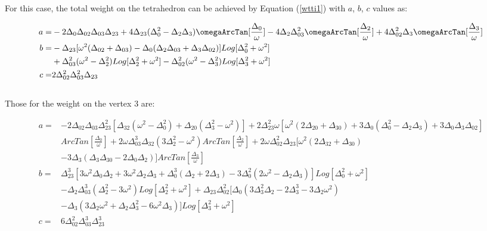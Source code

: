 \documentclass[10pt]{article}
\begin{document}
For this case, the total weight on the tetrahedron can be achieved by Equation (\ref{wtti1}) with $a$, $b$, $c$ values as:

\begin{subequations}\label{wtti2a}
\begin{align}
a=&-2\Delta_{0}\Delta_{02}\Delta_{03}\Delta_{23}+4\Delta_{23}(\Delta_0^2-\Delta_2\Delta_3)\omegaArcTan[\frac{\Delta_0}{\omega}]-4\Delta_{2}\Delta_{03}^2\omegaArcTan[\frac{\Delta_2}{\omega}]+4\Delta_{02}^2\Delta_{3}\omegaArcTan[\frac{\Delta_3}{\omega}]\\
b=&-\Delta_{23}[\omega^2(\Delta_{02}+\Delta_{03})-\Delta_0(\Delta_2\Delta_{03}+\Delta_3\Delta_{02})]Log[\Delta_0^2+\omega^2]\nonumber\\&+\Delta_{03}^2(\omega^2-\Delta_{2}^2)Log[\Delta_2^2+\omega^2]-\Delta_{02}^2(\omega^2-\Delta_{3}^2)Log[\Delta_3^2+\omega^2]\\
c=&2\Delta_{02}^2\Delta_{03}^2\Delta_{23}
\end{align}
\end{subequations}\\

Those for the weight on the vertex 3 are:

\begin{subequations}\label{wtti2az}
\begin{align}
a=&-2\Delta_{02}\Delta_{03}\Delta_{23}^2[\Delta_{32}(\omega^2-\Delta_0^2)+\Delta_{20}(\Delta_{3}^2-\omega^2)]+2\Delta_{23}^2\omega[\omega^2(2\Delta_{20}+\Delta_{30})+3\Delta_0(\Delta_0^2-\Delta_2\Delta_3)+3\Delta_0\Delta_3\Delta_{02}]\nonumber\\&ArcTan[\frac{\Delta_0}{\omega}]+2\omega\Delta_{03}^3\Delta_{32}(3\Delta_2^2-\omega^2)ArcTan[\frac{\Delta_2}{\omega}]+2\omega\Delta_{02}^2\Delta_{23}[\omega^2(2\Delta_{32}+\Delta_{30})\nonumber\\&-3\Delta_3(\Delta_3\Delta_{30}-2\Delta_0\Delta_2)]ArcTan[\frac{\Delta_3}{\omega}]\\
b=&\Delta_{23}^3[3\omega^2\Delta_0\Delta_2+3\omega^2\Delta_2\Delta_3+\Delta_0^3(\Delta_2+2\Delta_3)-3\Delta_0^2(2\omega^2-\Delta_2\Delta_3)]Log[\Delta_0^2+\omega^2]\nonumber\\&-\Delta_2\Delta_{03}^3(\Delta_2^2-3\omega^2)Log[\Delta_2^2+\omega^2]+\Delta_{23}\Delta_{02}^2[\Delta_0(3\Delta_3^2\Delta_2-2\Delta_3^3-3\Delta_2\omega^2)\nonumber\\&-\Delta_{3}(3\Delta_2\omega^2+\Delta_2\Delta_3^2-6\omega^2\Delta_3)]Log[\Delta_3^2+\omega^2]\\
c=&6\Delta_{02}^2\Delta_{03}^3\Delta_{23}^3
\end{align}
\end{subequations}\\
\end{document}
